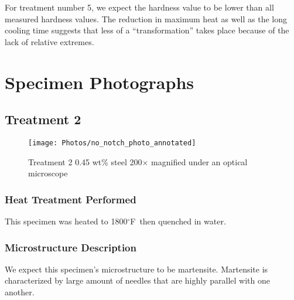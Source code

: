 \documentclass{article}
\newcommand{\degf}{$^\circ $F}
\begin{document}

For treatment number 5, we expect the hardness value to be lower than all measured hardness values. The reduction in maximum heat as well as the long cooling time suggests that less of a ``transformation'' takes place because of the lack of relative extremes.

\newpage
\section{Specimen Photographs}

\subsection*{Treatment 2}
\begin{figure}[H]
\centering
\texttt{[image: Photos/no\_notch\_photo\_annotated]}
\caption{Treatment 2 0.45 wt\% steel 200$\times$ magnified under an optical microscope}
\end{figure}

\subsubsection*{Heat Treatment Performed}
This specimen was heated to 1800\degf~then quenched in water.

\subsubsection*{Microstructure Description}
We expect this specimen's microstructure to be martensite. Martensite is characterized by large amount of needles that are highly parallel with one another. \cite{ref:msSteel,ref:engMaterials2}
\end{document}
